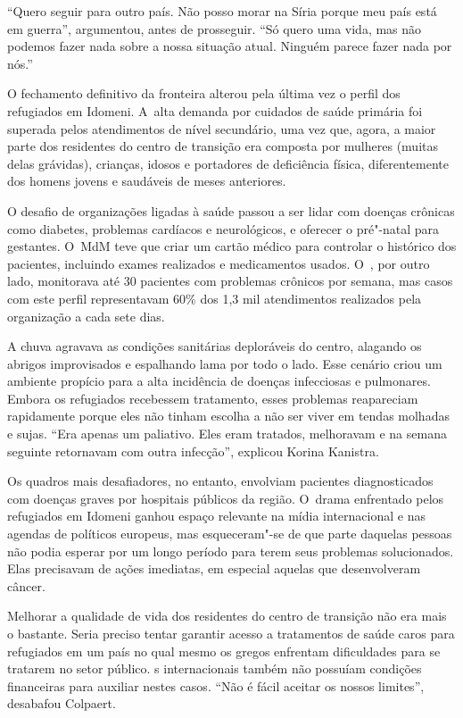 ``Quero seguir para outro país. Não posso morar na Síria porque meu país
está em guerra'', argumentou, antes de prosseguir. ``Só quero uma vida, mas não
podemos fazer nada sobre a nossa situação atual. Ninguém parece fazer
nada por nós.''

O fechamento definitivo da fronteira alterou pela última vez o perfil
dos refugiados em Idomeni. A~alta demanda por cuidados de saúde primária
foi superada pelos atendimentos de nível secundário, uma vez que, agora, a maior
parte dos residentes do centro de transição era composta por
mulheres (muitas delas grávidas), crianças, idosos e portadores
de deficiência física, diferentemente dos homens jovens e saudáveis de
meses anteriores.

O desafio de organizações ligadas à saúde passou a ser lidar com doenças
crônicas como diabetes, problemas cardíacos e neurológicos, e oferecer o
pré"-natal para gestantes. O~MdM teve que criar um cartão médico para
controlar o histórico dos pacientes, incluindo exames realizados e
medicamentos usados. O~, por outro lado, monitorava até 30 pacientes
com problemas crônicos por semana, mas casos com este perfil
representavam 60\% dos 1,3 mil atendimentos realizados pela organização
a cada sete dias.

A chuva agravava as condições sanitárias deploráveis do centro, alagando
os abrigos improvisados e espalhando lama por todo o lado. Esse cenário
criou um ambiente propício para a alta incidência de doenças infecciosas
e pulmonares. Embora os refugiados recebessem tratamento, esses
problemas reapareciam rapidamente porque eles não tinham escolha a não
ser viver em tendas molhadas e sujas. ``Era apenas um paliativo. Eles
eram tratados, melhoravam e na semana seguinte retornavam com outra
infecção'', explicou Korina Kanistra.

Os quadros mais desafiadores, no entanto, envolviam pacientes
diagnosticados com doenças graves por hospitais públicos da região. O~drama enfrentado pelos refugiados em Idomeni ganhou espaço relevante na
mídia internacional e nas agendas de políticos europeus, mas esqueceram"-se
de que parte daquelas pessoas não podia esperar por um longo período
para terem seus problemas solucionados. Elas precisavam de ações
imediatas, em especial aquelas que desenvolveram câncer.

Melhorar a qualidade de vida dos residentes do centro de transição não
era mais o bastante. Seria preciso tentar garantir acesso a tratamentos
de saúde caros para refugiados em um país no qual mesmo os gregos
enfrentam dificuldades para se tratarem no setor público. s
internacionais também não possuíam condições financeiras para auxiliar
nestes casos. ``Não é fácil aceitar os nossos limites'', desabafou
Colpaert.

